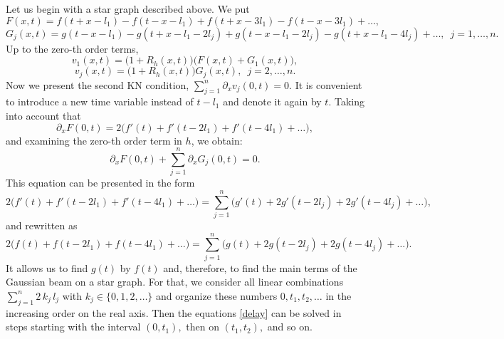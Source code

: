 \documentclass[11pt]{amsart}
\theoremstyle{definition}
\theoremstyle{plain}
\numberwithin{equation}{section}
\newcommand\pa{\partial}
\begin{document}
Let us begin with a star graph described above. We put
$$F(x,t)=f(t+x-l_1)-f(t-x-l_1)+f(t+x-3l_1)-f(t-x-3l_1)+\ldots,$$
$$G_j(x,t)=g(t-x-l_1)-g(t+x-l_1-2l_j)+g(t-x-l_1-2l_j)-g(t+x-l_1-4l_j)+\ldots,\ \; j=1,\ldots,n.  $$
Up to the zero-th order terms,
$$v_1(x,t)=\Big(1+ R_h(x,t) \Big) \Big(F(x,t)+G_1(x,t)\Big), $$$$ v_j(x,t)=\Big(1+ R_h(x,t) \Big)G_j(x,t), \ \; j=2,\ldots,n.$$  
Now we present the second KN condition, $\sum_{j=1}^n \pa_x v_j(0,t)=0.$ It is convenient to introduce a new time variable instead of $t-l_1$ and denote it again by $t.$ Taking into account that
$$ \pa_x F(0,t)=2\Big(f'(t)+f'(t-2l_1)+f'(t-4l_1)+\ldots \Big),$$
and examining the zero-th order term in $h$, we obtain:
\begin{equation} \label{kns}
\pa_x F(0,t)+\sum_{j=1}^n \pa_x  G_j(0,t)=0. %
\end{equation}
This equation can be presented in the form
\begin{equation} \label{delay}
2\Big( f'(t)+f'(t-2l_1)+f'(t-4l_1)+\ldots \Big)=\sum_{j=1}^n \Big(g'(t)+2g'(t-2l_j)+2g'(t-4l_j)+\ldots \Big),
\end{equation}
and rewritten as 
\begin{equation} \label{del}
2 \Big( f(t)+f(t-2l_1)+f(t-4l_1)+\ldots\Big)=\sum_{j=1}^n \Big(g(t)+2g(t-2l_j)+2g(t-4l_j)+\ldots \Big).
\end{equation}
It allows us to find $g(t)$ by $f(t)$ and, therefore, to find the main terms of the Gaussian beam on a star graph. For that, we consider all linear combinations $\sum_{j=1}^n 2\,k_j\,l_j$ with $k_j \in \{0,1,2,\ldots \}$ and
organize these numbers $0,t_1,t_2,\ldots$ in the increasing order on the real axis. Then the equations \eqref{delay} can be solved in steps starting with the interval $(0,t_1),$ then on $(t_1,t_2),$ and so on.
\end{document}

